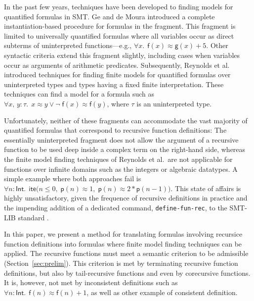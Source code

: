 \documentclass[runningheads,a4paper]{llncs}
\newcommand{\con}[1]{\mathsf{#1}}
\let\oldneg=\neg
\def\neg{\oldneg\;}
\let\oldvee=\vee
\def\vee{\mathrel{\oldvee}}
\newcommand{\teq}{\approx}
\newcommand{\typeint}{\ty{Int}}
\newcommand\ty[1]{\con{#1}}
\newcommand{\lite}{\con{ite}}
\newcommand{\vthinspace}{\kern+0.083333em}
\newcommand{\typ}[1]{^{\vthinspace #1}}
\begin{document}
In the past few years, techniques have been developed to finding models for
quantified formulas in SMT.
Ge and de Moura \cite{GeDeM-CAV-09} introduced a complete instantiation-based
procedure for formulas in the  fragment.
This fragment is limited to universally quantified formulas where all
variables occur as direct subterms of uninterpreted
functions---e.g., $\forall x%
.\;\, \con{f}( x )
\teq \con{g}( x ) + 5$.
Other syntactic criteria extend
this fragment slightly, including cases when variables occur as arguments of
arithmetic predicates. Subsequently, Reynolds et al.\
\cite{ReyEtAl-1-RR-13,reynolds-et-al-2013} introduced techniques for finding finite
models for quantified
formulas over uninterpreted types and types having a fixed finite
interpretation. %
These techniques can
find a model for a formula such as $\forall x,\, y : \tau.\;\, x \teq
y \vee \allowbreak \neg \con{f}( x ) \teq \con{f}( y )$, where $\tau$ is an uninterpreted type.

Unfortunately, neither of these fragments can accommodate the vast majority of
quantified formulas that correspond to recursive function definitions: The
essentially uninterpreted fragment does not allow the argument of a
recursive function to be used deep inside a complex term on the right-hand side,
whereas the finite model finding techniques of Reynolds et al.\ are not
applicable for functions over infinite domains such as the integers or
algebraic datatypes. A simple example where both approaches fail is
$\forall n : {\typeint}.\;\, \lite\bigl(
n \leq 0,\allowbreak\; \con{p}( n ) \teq 1,\allowbreak\; \con{p}( n ) \teq 2 * \con{p}( n - 1 ) \bigr)$.
This state of affairs is highly unsatisfactory, given the frequence of
recursive definitions in practice and the impending addition of a dedicated
command, \texttt{define-fun-rec}, to the SMT-LIB standard \cite{smtlib25}.

In this paper, we present a method for translating formulas involving recursice function
definitions into formulas where finite model finding techniques can be applied.
The recursive functions must meet a semantic criterion to be admissible
(Section~\ref{sec:prelim}). This criterion is met by terminating recursive
function definitions, but also by tail-recursive functions and even by
\relax{productive} corecursive functions. It is, however, not met by inconsistent
definitions such as $\forall n : {\typeint}.\;\, \con{f}(n) \teq \con{f}(n) +
1$, %
as well as other example of consistent definition.
\end{document}
